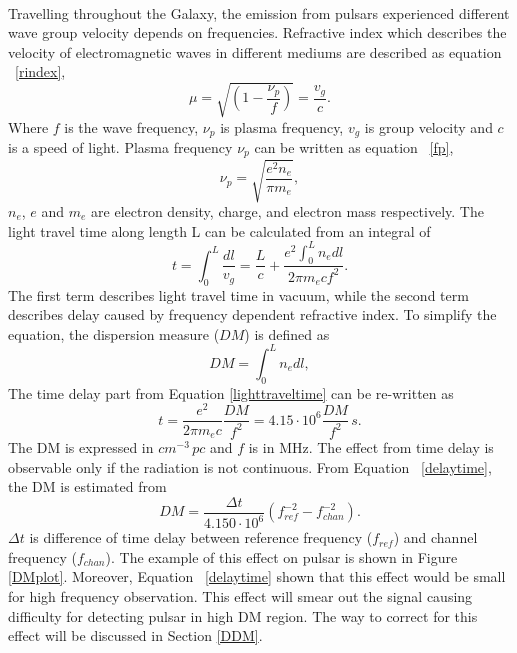 \documentclass[thesis_msc.tex]{subfiles}
\begin{document}
\paragraph{} Travelling throughout the Galaxy, the emission from pulsars experienced different wave group velocity depends on frequencies. Refractive index which describes the velocity of electromagnetic waves in different mediums are described as equation ~\ref{rindex}, 
\begin{equation}\label{rindex}
\mu=\sqrt{(1-\dfrac{\nu_p}{f})}=\dfrac{v_g}{c}.
\end{equation} 
Where $f$ is the wave frequency, $\nu_p$ is plasma frequency, $v_g$ is group velocity and $c$ is a speed of light. Plasma frequency $\nu_p$ can be written as equation ~\ref{fp},
 \begin{equation}\label{fp}
 \nu_p=\sqrt{\dfrac{e^2n_e}{\pi m_e}},
  \end{equation} 
$n_e$, $e$ and $m_e$ are electron density, charge, and electron mass respectively. The light travel time along length L can be calculated from an integral of  
\begin{equation}\label{lighttraveltime}
 t=\int_{0}^{L}\dfrac{dl}{v_g}=\dfrac{L}{c}+\dfrac{e^2 \int_{0}^{L} n_e dl}{2\pi m_e c f^2}.
\end{equation} 
The first term describes light travel time in vacuum, while the second term describes delay caused by frequency dependent refractive index. To simplify the equation, the dispersion measure ($DM$) is defined as  
\begin{equation}
\label{DMdef}
DM=\int_{0}^{L} n_e dl,
\end{equation}
The time delay part from Equation \ref{lighttraveltime} can be re-written as    
\begin{equation}
\label{delaytime}
t=\dfrac{e^2}{2 \pi m_e c }\dfrac{DM}{f^2}=4.15\cdot 10^6 \dfrac{DM}{f^2}\,s.
\end{equation}
The DM is expressed in $cm^{-3} \, pc$ and $f$ is in MHz. The effect from time delay is observable only if the radiation is not continuous. From Equation ~\ref{delaytime}, the DM is estimated from 
\begin{equation}
\label{DMcal}
DM=\dfrac{\Delta t}{4.150\cdot 10^6}(f_{ref}^{-2}-f_{chan}^{-2}).
\end{equation}
  $\Delta t$ is difference of time delay between reference frequency ($f_{ref}$) and channel frequency ($f_{chan}$). The example of this effect on pulsar is shown in Figure \ref{DMplot}. Moreover, Equation ~\ref{delaytime} shown that this effect would be small for high frequency observation. This effect will smear out the signal causing difficulty for detecting pulsar in high DM region. The way to correct for this effect will be discussed in Section \ref{DDM}.    
\end{document}
